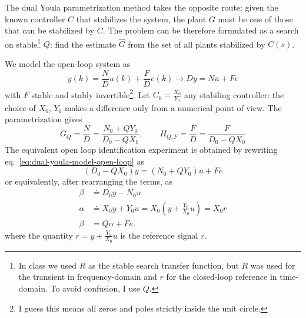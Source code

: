 The dual Youla parametrization method takes the opposite route: given the known controller $C$ that stabilizes the system, the plant $G$ must be one of those that can be stabilized by $C$. The problem can be therefore formulated as a search on stable\footnote{In class we used $R$ as the stable search transfer function, but $R$ was used for the transient in frequency-domain and $r$ for the closed-loop reference in time-domain. To avoid confusion, I use $Q$.} $Q$: find the estimate $\hat{G}$ from the set of all plants stabilized by $C(s)$. %

We model the open-loop system as
\begin{equation}
  \label{eq:dual-youla-model-open-loop}
  y(k) = \frac{N}{D}u(k) + \frac{F}{D}e(k) \rightarrow Dy = Nu + Fe
\end{equation}
with $F$ stable and stably invertible\footnote{I guess this means all zeros and poles strictly inside the unit circle.}. Let $C_0=\frac{X_0}{Y_0}$ any stabiling controller: the choice of $X_0$, $Y_0$ makes a difference only from a numerical point of view. The parametrization gives
\begin{equation*}
  G_Q = \frac{N}{D} = \frac{N_0+QY_0}{D_0-QX_0},\hspace{2em} H_{Q,F} = \frac{F}{D} = \frac{F}{D_0-QX_0}
\end{equation*}
The equivalent open loop identification experiment is obtained by rewriting eq.~\ref{eq:dual-youla-model-open-loop} as
\begin{equation*}
  (D_0-QX_0)y = (N_0+QY_0)u + Fe %
\end{equation*}
or equivalently, after rearranging the terms, as
\begin{equation*}
  \begin{aligned}
    \beta &\doteq D_0y-N_0u \\
    \alpha &\doteq X_0y+Y_0u = X_0\left(y + \frac{Y_0}{X_0}u\right) = X_0r \\
    \beta &= Q\alpha + Fe.
  \end{aligned}
\end{equation*}
where the quantity $r = y + \frac{Y_0}{X_0}u$ is the reference signal $r$.

